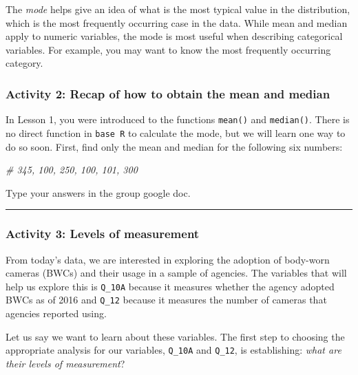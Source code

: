 \documentclass[
]{book}
\newenvironment{Shaded}{\begin{snugshade}}{\end{snugshade}}
\newcommand{\CommentTok}[1]{\textcolor[rgb]{0.56,0.35,0.01}{\textit{#1}}}
\begin{document}
The \emph{mode} helps give an idea of what is the most typical value in the distribution, which is the most frequently occurring case in the data. While mean and median apply to numeric variables, the mode is most useful when describing categorical variables. For example, you may want to know the most frequently occurring category.

\hypertarget{activity-2-recap-of-how-to-obtain-the-mean-and-median}{%
\subsubsection{Activity 2: Recap of how to obtain the mean and median}\label{activity-2-recap-of-how-to-obtain-the-mean-and-median}}

In Lesson 1, you were introduced to the functions \texttt{mean()} and \texttt{median()}. There is no direct function in \texttt{base\ R} to calculate the mode, but we will learn one way to do so soon. First, find only the mean and median for the following six numbers:

\begin{Shaded}
\begin{Highlighting}[]
\CommentTok{\# 345, 100, 250, 100, 101, 300 }
\end{Highlighting}
\end{Shaded}

Type your answers in the group google doc.

\begin{center}\rule{0.5\linewidth}{0.5pt}\end{center}

\hypertarget{activity-3-levels-of-measurement}{%
\subsubsection{Activity 3: Levels of measurement}\label{activity-3-levels-of-measurement}}

From today's data, we are interested in exploring the adoption of body-worn cameras (BWCs) and their usage in a sample of agencies. The variables that will help us explore this is \texttt{Q\_10A} because it measures whether the agency adopted BWCs as of 2016 and \texttt{Q\_12} because it measures the number of cameras that agencies reported using.

Let us say we want to learn about these variables. The first step to choosing the appropriate analysis for our variables, \texttt{Q\_10A} and \texttt{Q\_12}, is establishing: \emph{what are their levels of measurement}?
\end{document}
